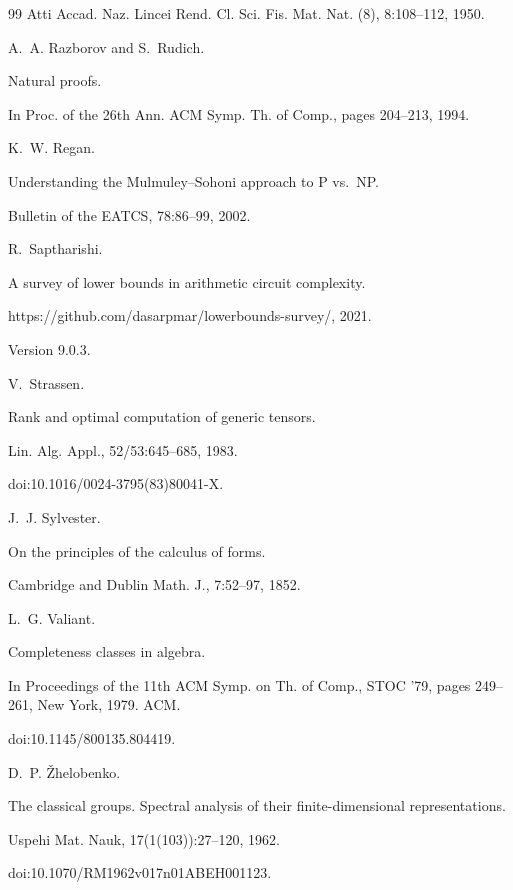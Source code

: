 \begin{thebibliography}{99}
Atti Accad. Naz. Lincei Rend. Cl. Sci. Fis. Mat. Nat. (8),
8:108–112, 1950.

A. A. Razborov and S. Rudich.


Natural proofs.


In Proc. of the 26th Ann. ACM Symp. Th. of Comp., pages
204–213, 1994.

K. W. Regan.


Understanding the Mulmuley–Sohoni approach to P vs. NP.


Bulletin of the EATCS, 78:86–99, 2002.

R. Saptharishi.


A survey of lower bounds in arithmetic circuit complexity.


https://github.com/dasarpmar/lowerbounds-survey/, 2021.


Version 9.0.3.

V. Strassen.


Rank and optimal computation of generic tensors.


Lin. Alg. Appl., 52/53:645–685, 1983.


doi:10.1016/0024-3795(83)80041-X.

J. J. Sylvester.


On the principles of the calculus of forms.


Cambridge and Dublin Math. J., 7:52–97, 1852.

L. G. Valiant.


Completeness classes in algebra.


In Proceedings of the 11th ACM Symp. on Th. of Comp., STOC
’79, pages 249–261, New York, 1979. ACM.


doi:10.1145/800135.804419.

D. P. Žhelobenko.


The classical groups. Spectral analysis of their finite-dimensional
representations.


Uspehi Mat. Nauk, 17(1(103)):27–120, 1962.


doi:10.1070/RM1962v017n01ABEH001123.

\end{thebibliography}
